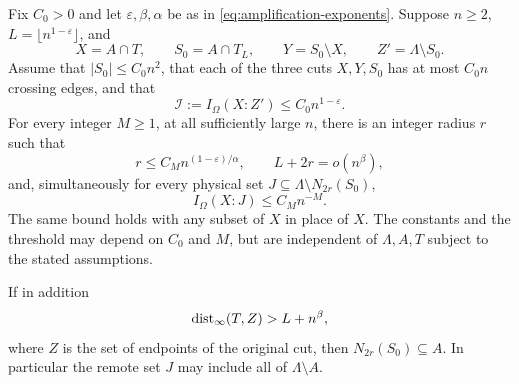 \begin{proposition}[Amplification]\label{prop:amplification}
Fix $C_0>0$ and let $\varepsilon,\beta,\alpha$ be as in
\eqref{eq:amplification-exponents}.  Suppose $n\ge2$,
$L=\lfloor n^{1-\varepsilon}\rfloor$, and
\[
 X=A\cap T,\qquad S_0=A\cap T_L,\qquad Y=S_0\setminus X,
 \qquad Z'=\Lambda\setminus S_0.
\]
Assume that $|S_0|\le C_0n^2$, that each of the three cuts
$X,Y,S_0$ has at most $C_0n$ crossing edges, and that
\begin{equation}\label{eq:amplification-input-information}
 \mathcal I:=I_\Omega(X:Z')\le C_0n^{1-\varepsilon}.
\end{equation}
For every integer $M\ge1$, at all sufficiently large $n$, there is
an integer radius $r$ such that
\begin{equation}\label{eq:amplification-radius}
 r\le C_M n^{(1-\varepsilon)/\alpha},\qquad
 L+2r=o(n^\beta),
\end{equation}
and, simultaneously for every physical set
$J\subseteq\Lambda\setminus N_{2r}(S_0)$,
\begin{equation}\label{eq:amplification-output}
 I_\Omega(X:J)\le C_M n^{-M}.
\end{equation}
The same bound holds with any subset of $X$ in place of $X$.
The constants and the threshold may depend on $C_0$ and $M$, but are
independent of $\Lambda,A,T$ subject to the stated assumptions.

If in addition
\begin{equation}\label{eq:amplification-cut-clearance}
 \operatorname{dist}_\infty(T,Z)>L+n^\beta,
\end{equation}
where $Z$ is the set of endpoints of the original cut, then
$N_{2r}(S_0)\subseteq A$.  In particular the remote set $J$ may
include all of $\Lambda\setminus A$.
\end{proposition}

